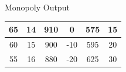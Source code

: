 \documentclass{beamer}
\begin{document}
\begin{frame}[t]{Monopoly Output}
\begin{table}[H]
\begin{tabular}{cccccc}
    65         & 14                                                           & 910                                                      & 0                                                           & 575                                                                & 15                                                      \\ \hline
    60         & 15                                                           & 900                                                      & -10                                                         & 595                                                                & 20                                                      \\ \hline
    55         & 16                                                           & 880                                                      & -20                                                         & 625                                                                & 30                                                     
    \end{tabular}
    \end{table}
\end{frame}
\end{document}

